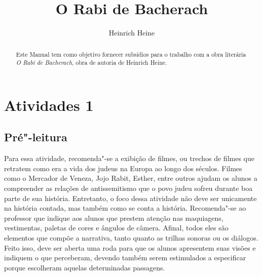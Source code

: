 \documentclass[12pt]{extarticle}
\begin{document}
\newcommand{\AutorLivro}{Heinrich Heine}
\newcommand{\TituloLivro}{O Rabi de Bacherach}
\newcommand{\Tema}{Ficção, mistério e fantasia}
\newcommand{\Genero}{Romance}
\newcommand{\imagemCapa}{./images/PNLD0018-01.png}
\newcommand{\issnppub}{---}
\newcommand{\issnepub}{---}
\newcommand{\colaborador}{\textbf{Michelle Etienne Florence, Bruno Gradella e Vicente Castro} é uma pessoa incrível e vai fazer um bom serviço.}


\title{\TituloLivro}
\author{\AutorLivro}
\def\authornotes{\colaborador}

\date{}
\maketitle

\begin{abstract}

Este Manual tem como objetivo fornecer subsídios para o trabalho com a
obra literária \emph{O Rabi de Bacherach}, obra de autoria de Heinrich
Heine.

\end{abstract}

\tableofcontents

\section{Atividades 1}


\subsection{Pré"-leitura}


Para essa atividade, recomenda"-se a exibição de filmes, ou
trechos de filmes que retratem como era a vida dos judeus na Europa ao
longo dos séculos. Filmes como o Mercador de Veneza, Jojo Rabit, Esther,
entre outros ajudam os alunos a compreender as relações de
antissemitismo que o povo judeu sofreu durante boa parte de sua
história. Entretanto, o foco dessa atividade não deve ser unicamente na
história contada, mas também como se conta a história. Recomenda"-se ao
professor que indique aos alunos que prestem atenção nas maquiagens,
vestimentas, paletas de cores e ângulos de câmera. Afinal, todos eles
são elementos que compõe a narrativa, tanto quanto as trilhas sonoras ou
os diálogos. Feito isso, deve ser aberta uma roda para que os alunos
apresentem suas visões e indiquem o que perceberam, devendo também serem
estimulados a especificar porque escolheram aquelas determinadas
passagens.
\end{document}
